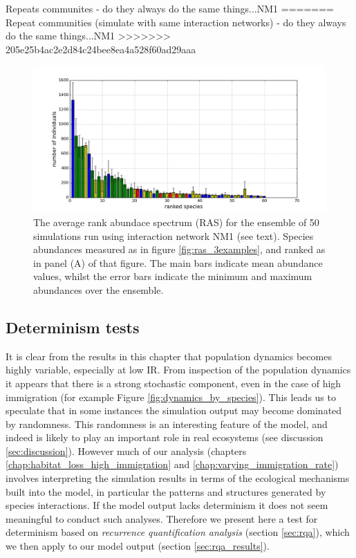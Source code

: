 Repeats communites - do they always do the same things...NM1
=======
Repeat communities (simulate with same interaction networks) - do they always do the same things...NM1
>>>>>>> 205e25b4ac2e2d84c24bee8ea4a528f60ad29aaa

\begin{figure}[h!]
	\centering
	\includegraphics[width=1.0\linewidth]{"./chapters/chapter04b/figures/ras_dist"}
    \caption{The average rank abundace spectrum (RAS) for the ensemble of 50 simulations run using interaction network NM1 (see text). Species abundances measured as in figure \ref{fig:ras_3examples}, and ranked as in panel (A) of that figure. The main bars indicate mean abundance values, whilst the error bars indicate the minimum and maximum abundances over the ensemble.}    
    \label{fig:ras_dist}
\end{figure}

\clearpage
\subsection{Determinism tests}
\label{sec:determinism}

It is clear from the results in this chapter that population dynamics becomes highly variable, especially at low IR. From inspection of the population dynamics it appears that there is a strong stochastic component, even in the case of high immigration (for example Figure \ref{fig:dynamics_by_species}). This leads us to speculate that in some instances the simulation output may become dominated by randomness. This randomness is an interesting feature of the model, and indeed is likely to play an important role in real ecosystems (see discussion \ref{sec:discussion}). However much of our analysis (chapters \ref{chap:habitat_loss_high_immigration} and \ref{chap:varying_immigration_rate}) involves interpreting the simulation results in terms of the ecological mechanisms built into the model, in particular the patterns and structures generated by species interactions. If the model output lacks determinism it does not seem meaningful to conduct such analyses. Therefore we present here a test for determinism based on \emph{recurrence quantification analysis} (section \ref{sec:rqa}), which we then apply to our model output (section \ref{sec:rqa_results}).


